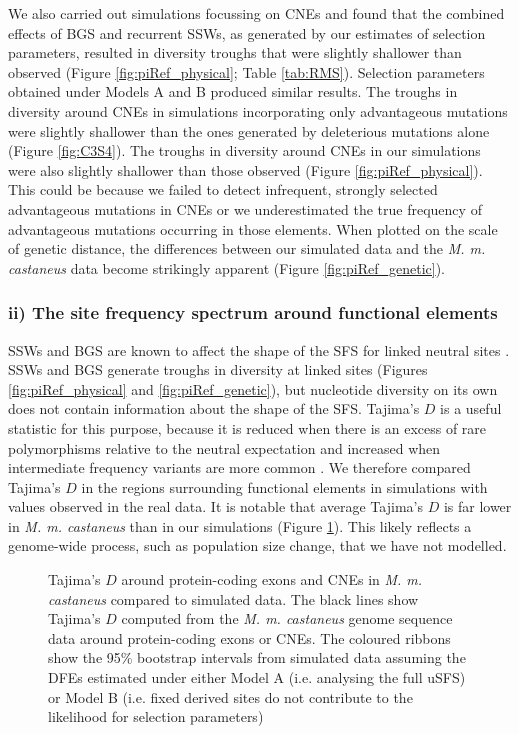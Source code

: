 	We also carried out simulations focussing on CNEs and found that the combined effects of BGS and recurrent SSWs, as generated by our estimates of selection parameters, resulted in diversity troughs that were slightly shallower than observed (Figure \ref{fig:piRef_physical}; Table \ref{tab:RMS}). Selection parameters obtained under Models A and B produced similar results. The troughs in diversity around CNEs in simulations incorporating only advantageous mutations were slightly shallower than the ones generated by deleterious mutations alone (Figure \ref{fig:C3S4}). The troughs in diversity around CNEs in our simulations were also slightly shallower than those observed (Figure \ref{fig:piRef_physical}). This could be because we failed to detect infrequent, strongly selected advantageous mutations in CNEs or we underestimated the true frequency of advantageous mutations occurring in those elements. When plotted on the scale of genetic distance, the differences between our simulated data and the \textit{M. m. castaneus} data become strikingly apparent (Figure \ref{fig:piRef_genetic}). 


\subsubsection{ii) The site frequency spectrum around functional elements}

	SSWs and BGS are known to affect the shape of the SFS for linked neutral sites \citep{RN287, RN234, RN343}. SSWs and BGS generate troughs in diversity at linked sites (Figures \ref{fig:piRef_physical} and \ref{fig:piRef_genetic}), but nucleotide diversity on its own does not contain information about the shape of the SFS. Tajima’s $D$ is a useful statistic for this purpose, because it is reduced when there is an excess of rare polymorphisms relative to the neutral expectation and increased when intermediate frequency variants are more common \citep{RN90}. We therefore compared Tajima’s $D$ in the regions surrounding functional elements in simulations with values observed in the real data. It is notable that average Tajima’s $D$ is far lower in \textit{M. m. castaneus} than in our simulations (Figure \ref{fig:TajimaPlot}). This likely reflects a genome-wide process, such as population size change, that we have not modelled.

 \begin{figure}[H]
   \centering      
   \noindent{}
 \caption[Tajima's $D$ around functional elements in \textit{M. m. castaneus} and simulated populations]{Tajima’s $D$ around protein-coding exons and CNEs in \textit{M. m. castaneus} compared to simulated data. The black lines show Tajima’s $D$ computed from the \textit{M. m. castaneus} genome sequence data around protein-coding exons or CNEs. The coloured ribbons show the 95\% bootstrap intervals from simulated data assuming the DFEs estimated under either Model A (i.e. analysing the full uSFS) or Model B (i.e. fixed derived sites do not contribute to the likelihood for selection parameters)}
 \label{fig:TajimaPlot}
\end{figure}


